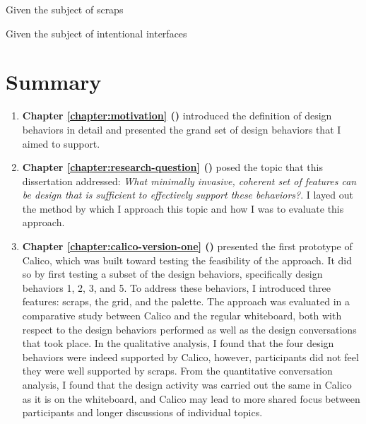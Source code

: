 \documentclass[12pt,fleqn]{ucithesis}
\begin{document}
Given the subject of scraps

Given the subject of intentional interfaces

\section{Summary}

 \begin{enumerate}

   \item \textbf{Chapter \ref{chapter:motivation} ()} introduced the definition of design behaviors in detail and presented the grand set of design behaviors that I aimed to support. 

   \item \textbf{Chapter \ref{chapter:research-question} ()} posed the topic that this dissertation addressed: \textit{What minimally invasive, coherent set of features can be design that is sufficient to effectively support these behaviors?}. I layed out the method by which I approach this topic and how I was to evaluate this approach.

   \item \textbf{Chapter \ref{chapter:calico-version-one} ()} presented the first prototype of Calico, which was built toward testing the feasibility of the approach. It did so by first testing a subset of the design behaviors, specifically design behaviors 1, 2, 3, and 5. To address these behaviors, I introduced three features: scraps, the grid, and the palette. The approach was evaluated in a comparative study between Calico and the regular whiteboard, both with respect to the design behaviors performed as well as the design conversations that took place. In the qualitative analysis, I found that the four design behaviors were indeed supported by Calico, however, participants did not feel they were well supported by scraps. From the quantitative conversation analysis, I found that the design activity was carried out the same in Calico as it is on the whiteboard, and Calico may lead to more shared focus between participants and longer discussions of individual topics.


\end{enumerate}
\end{document}
